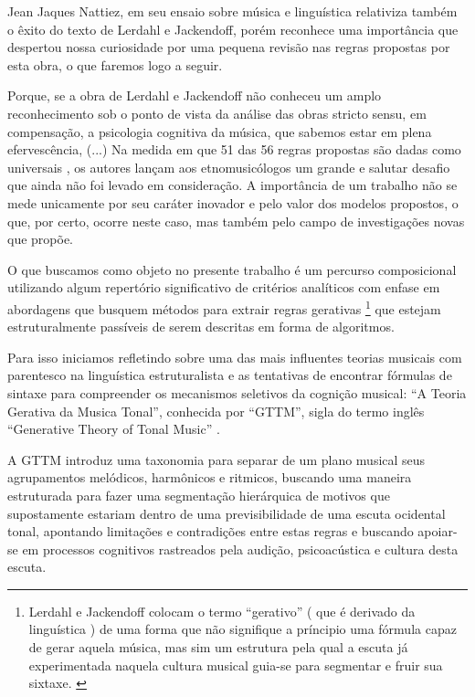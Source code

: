 \documentclass[
	12pt,				%
	openright,			%
	twoside,			%
	a4paper,			%
	english,			%
	french,				%
	spanish,			%
	brazil				%
	]{abntex2}
\begin{document}
Jean Jaques Nattiez, em seu ensaio sobre música e linguística \cite{nattiez2004modelos} relativiza também o êxito do texto de Lerdahl e Jackendoff, porém reconhece uma importância  que despertou nossa curiosidade por uma pequena revisão nas regras propostas por esta obra, o que faremos logo a seguir.

\begin{citacao}
Porque, se a obra de Lerdahl e Jackendoff não conheceu um amplo reconhecimento sob o ponto de vista da análise das obras stricto sensu, em compensação, a psicologia cognitiva da música, que sabemos estar em plena efervescência, (...) Na medida em que 51 das 56 regras propostas são dadas como universais \cite[ p.345-352]{lerdahl1983generative}, os autores lançam aos etnomusicólogos um grande e salutar desafio que ainda não foi levado em consideração. A importância de um trabalho não se mede unicamente por seu caráter inovador e pelo valor dos modelos propostos, o que, por certo, ocorre neste caso, mas também pelo campo de investigações novas que propõe.
\cite{nattiez2004modelos}
\end{citacao}


O que buscamos como objeto no presente trabalho é um percurso composicional utilizando algum repertório significativo de critérios analíticos com enfase em abordagens que busquem métodos para extrair regras gerativas
\footnote{
Lerdahl e Jackendoff colocam o termo “gerativo” ( que é derivado da linguística ) de uma forma que não signifique a príncipio uma fórmula capaz de gerar aquela música, mas sim um estrutura pela qual a escuta já experimentada naquela cultura musical guia-se para segmentar e fruir sua sixtaxe. \cite[ p.6]{lerdahl1983generative}
}
que estejam estruturalmente passíveis de serem descritas em forma de algoritmos. 

Para isso iniciamos refletindo sobre uma das mais influentes teorias musicais com parentesco na linguística estruturalista e as tentativas de encontrar fórmulas de sintaxe para compreender os mecanismos seletivos da cognição musical: “A Teoria Gerativa da Musica Tonal”, conhecida por “GTTM”, sigla do termo inglês “Generative Theory of Tonal Music” \cite{lerdahl1983generative}.

A GTTM introduz uma taxonomia para separar de um plano musical seus agrupamentos melódicos, harmônicos e ritmicos, buscando uma maneira estruturada para fazer uma segmentação hierárquica de motivos que supostamente estariam dentro de uma previsibilidade de uma escuta ocidental tonal, apontando limitações e contradições entre estas regras e buscando apoiar-se em processos cognitivos rastreados pela audição, psicoacústica e cultura desta escuta. 
\end{document}
